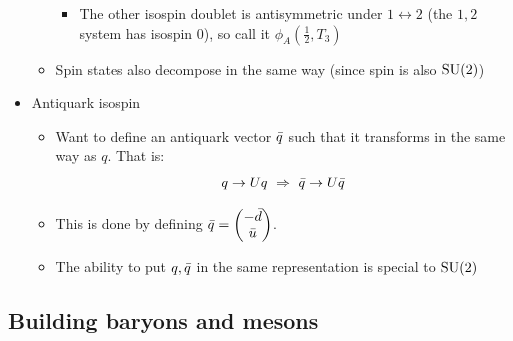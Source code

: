 \begin{itemize}
\begin{itemize}
\begin{itemize}
      \item The other isospin doublet is antisymmetric under $1\leftrightarrow2$ (the $1,2$ system has isospin $0$), so call it $\phi_A\left(\frac{1}{2},T_3\right)$
    \end{itemize}
    \item Spin states also decompose in the same way (since spin is also $\operatorname{SU}(2)$)
  \end{itemize}
  \item Antiquark isospin
  \begin{itemize}
    \item Want to define an antiquark vector ${\bar{q}}$ such that it transforms in the same way as $q$. That is:
    \begin{equation}
      q \rightarrow U q~\Rightarrow~ {\bar{q}} \rightarrow U {\bar{q}}
    \end{equation}
    \item This is done by defining ${\bar{q}} = \begin{pmatrix} - \bar{d} \\ \bar{u} \end{pmatrix}$.
    \item The ability to put $q,{\bar{q}}$ in the same representation is special to $\operatorname{SU}(2)$
  \end{itemize}
\end{itemize}

\subsection{Building baryons and mesons}
